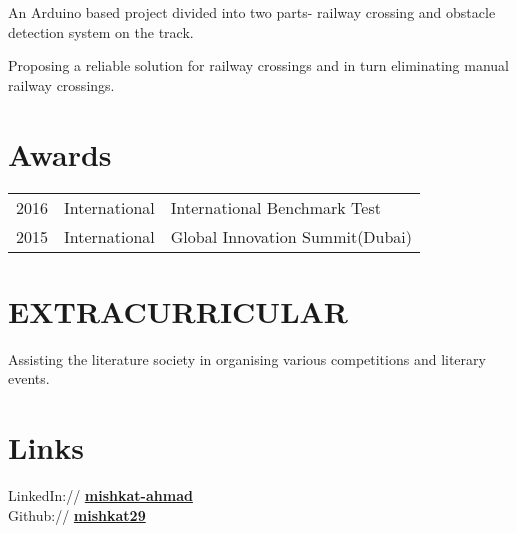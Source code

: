\documentclass[]{deedy-resume-openfont}
\begin{document}
\begin{minipage}[t]{0.60\textwidth}
\textbullet{}An Arduino based project divided into two parts- railway crossing and obstacle detection system on the track.
\sectionsep

\textbullet{}Proposing a reliable solution for railway crossings and in turn eliminating manual railway crossings.
\sectionsep




\section{Awards} 
\begin{tabular}{rll}

2016	     &International  & International Benchmark Test\\
2015	     &International  & Global Innovation Summit(Dubai)\\

\end{tabular}
\sectionsep


\section{EXTRACURRICULAR}
\textbullet{}Assisting the literature society in organising various competitions and literary events.\\
\sectionsep




\section{Links} 

LinkedIn://  \href{https://www.linkedin.com/in/mishkat-ahmad/}{\bf mishkat-ahmad} \\
Github:// \href{https://github.com/mishkat29}{\bf mishkat29} \\

\end{minipage} 
\end{document}
